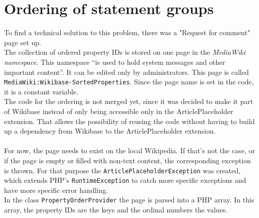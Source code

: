 \section{Ordering of statement groups}\label{ordering-stat}

To find a technical solution to this problem, there was a "Request for comment" page set up. \citep{wiki:24} \\

The collection of ordered property IDs is stored on one page in the \textit{MediaWiki namespace}. This namespace ``is used to hold system messages and other important content''. \citep{wiki:17} It can be edited only by administrators. This page is called \texttt{\justify MediaWiki:Wikibase-SortedProperties}. Since the page name is set in the code, it is a constant variable. \\
The code for the ordering is not merged yet, since it was decided to make it part of Wikibase instead of only being accessible only in the ArticlePlaceholder extension. That allows the possibility of reusing the code without having to build up a dependency from Wikibase to the ArticlePlaceholder extension. \\
\\
For now, the page needs to exist on the local Wikipedia. If that's not the case, or if the page is empty or filled with non-text content, the corresponding exception is thrown. For that purpose the \texttt{\justify ArticlePlaceholderException} was created, which extends PHP's \texttt{\justify RuntimeException} to catch more specific exceptions and have more specific error handling. \\
In the class \texttt{\justify PropertyOrderProvider} the page is parsed into a PHP array. In this array, the property IDs are the keys and the ordinal numbers the values. \\

